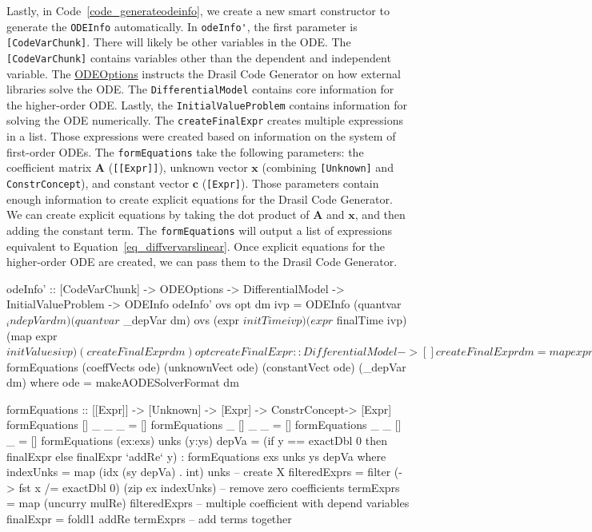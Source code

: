 Lastly, in Code~\ref{code_generateodeinfo}, we create a new smart constructor to generate the \verb|ODEInfo| automatically. In \verb|odeInfo'|, the first parameter is \verb|[CodeVarChunk]|. There will likely be other variables in the ODE. The \verb|[CodeVarChunk]| contains variables other than the dependent and independent variable. The \href{https://jacquescarette.github.io/Drasil/docs/full/drasil-code-0.1.9.0/Language-Drasil-Data-ODEInfo.html#t:ODEOptions}{ODEOptions} instructs the Drasil Code Generator on how external libraries solve the ODE. The \verb|DifferentialModel| contains core information for the higher-order ODE. Lastly, the \verb|InitialValueProblem| contains information for solving the ODE numerically. The \verb|createFinalExpr| creates multiple expressions in a list. Those expressions were created based on information on the system of first-order ODEs. The \verb|formEquations| take the following parameters: the coefficient matrix $\boldsymbol{A}$ (\verb|[[Expr]]|), unknown vector $\boldsymbol{x}$ (combining \verb|[Unknown]| and \verb|ConstrConcept|), and constant vector $\boldsymbol{c}$ (\verb|[Expr]|). Those parameters contain enough information to create explicit equations for the Drasil Code Generator. We can create explicit equations by taking the dot product of $\boldsymbol{A}$ and $\boldsymbol{x}$, and then adding the constant term. The \verb|formEquations| will output a list of expressions equivalent to Equation~\ref{eq_diffvervarslinear}. Once explicit equations for the higher-order ODE are created, we can pass them to the Drasil Code Generator.

\begin{listing}[ht]
\begin{haskell1}
odeInfo' :: [CodeVarChunk] -> ODEOptions -> DifferentialModel -> InitialValueProblem -> ODEInfo
odeInfo' ovs opt dm ivp = ODEInfo 
  (quantvar $ _indepVar dm) 
  (quantvar $ _depVar dm) 
  ovs 
  (expr $ initTime ivp)
  (expr $ finalTime ivp)
  (map expr $ initValues ivp)
  (createFinalExpr dm)
  opt

createFinalExpr :: DifferentialModel -> []
createFinalExpr dm = map expr $ formEquations (coeffVects ode) (unknownVect ode) (constantVect ode) (_depVar dm)
  where ode = makeAODESolverFormat dm

formEquations :: [[Expr]] -> [Unknown] -> [Expr] -> ConstrConcept-> [Expr]
formEquations [] _ _ _ = []
formEquations _ [] _ _ = []
formEquations _ _ [] _ = []
formEquations (ex:exs) unks (y:ys) depVa =
  (if y == exactDbl 0 then finalExpr else finalExpr `addRe` y) : formEquations exs unks ys depVa
  where indexUnks = map (idx (sy depVa) . int) unks -- create X
        filteredExprs = filter (\x -> fst x /= exactDbl 0) (zip ex indexUnks) -- remove zero coefficients
        termExprs = map (uncurry mulRe) filteredExprs -- multiple coefficient with depend variables
        finalExpr = foldl1 addRe termExprs -- add terms together
\end{haskell1}
\label{code_generateodeinfo}
\end{listing}

